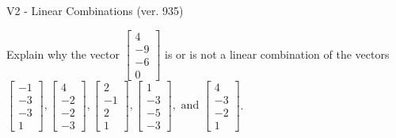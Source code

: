 \begin{exercise}
  \begin{exerciseTitle}V2 - Linear Combinations (ver. 935)\end{exerciseTitle}
  \begin{exerciseStatement}
    Explain why the vector \(\left[\begin{array}{c}
4 \\
-9 \\
-6 \\
0
\end{array}\right]\)  is or is not a linear 
	combination of the vectors \(\left[\begin{array}{c}
-1 \\
-3 \\
-3 \\
1
\end{array}\right] , \left[\begin{array}{c}
4 \\
-2 \\
-2 \\
-3
\end{array}\right] , \left[\begin{array}{c}
2 \\
-1 \\
2 \\
1
\end{array}\right] , \left[\begin{array}{c}
1 \\
-3 \\
-5 \\
-3
\end{array}\right] , \text{ and } \left[\begin{array}{c}
4 \\
-3 \\
-2 \\
1
\end{array}\right]\).
	



\end{exerciseStatement}
\end{exercise}
